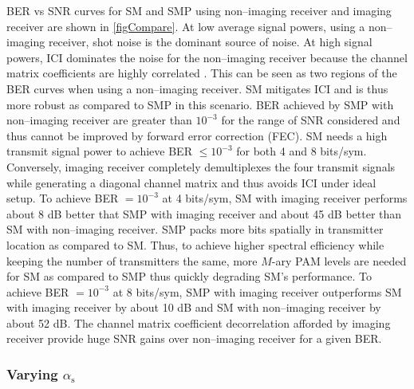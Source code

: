 BER vs SNR curves for SM and SMP using non--imaging receiver and imaging receiver are shown in \figurename{ \ref{figCompare}}. At low average signal powers, using a non--imaging receiver, shot noise is the dominant source of noise. At high signal powers, ICI dominates the noise for the non--imaging receiver because the channel matrix coefficients are highly correlated \cite{zen09a}. This can be seen as two regions of the BER curves when using a non--imaging receiver. SM mitigates ICI and is thus more robust as compared to SMP in this scenario. BER achieved by SMP with non--imaging receiver are greater than $10^{-3}$ for the range of SNR considered and thus cannot be improved by forward error correction (FEC). SM needs a high transmit signal power to achieve BER $\leq 10^{-3}$ for both 4 and 8 bits/sym. Conversely, imaging receiver completely demultiplexes the four transmit signals while generating a diagonal channel matrix and thus avoids ICI under ideal setup. To achieve BER $=10^{-3}$ at 4 bits/sym, SM with imaging receiver performs about 8 dB better that SMP with imaging receiver and about 45 dB better than SM with non--imaging receiver. SMP packs more bits spatially in transmitter location as compared to SM. Thus, to achieve higher spectral efficiency while keeping the number of transmitters the same, more $M$-ary PAM levels are needed for SM as compared to SMP thus quickly degrading SM's performance. To achieve BER $=10^{-3}$ at 8 bits/sym, SMP with imaging receiver outperforms SM with imaging receiver by about 10 dB and SM with non--imaging receiver by about 52 dB. The channel matrix coefficient decorrelation afforded by imaging receiver provide huge SNR gains over non--imaging receiver for a given BER.


\subsubsection{Varying $\alpha_{\text{s}}$}
\label{subsec:osmResultsAlpha}

